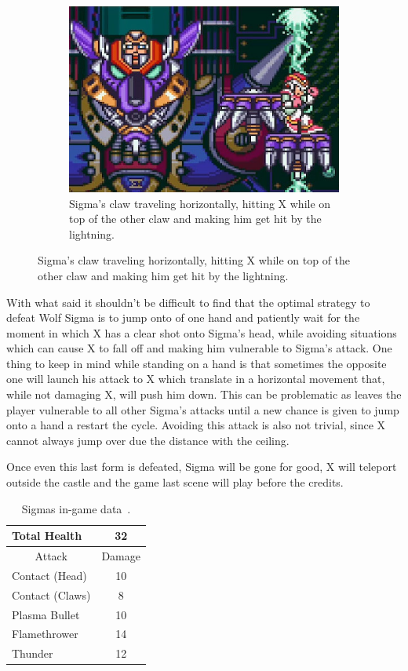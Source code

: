 \begin{figure}[htp]
	\centering
	\begin{subfigure}{0.5\linewidth}
		\centering
		\includegraphics[width=\linewidth]{figures/X1/Sigma_stages/WolfSigma_claw_2.jpg}
		\caption{Sigma's claw traveling horizontally, hitting X while on top of the other claw and making him get hit by the lightning.}
	\end{subfigure}
\end{figure}

With what said it shouldn't be difficult to find that the optimal strategy to defeat Wolf Sigma is to jump onto of one hand and patiently wait for the moment in which X has a clear shot onto Sigma's head, while avoiding situations which can cause X to fall off and making him vulnerable to Sigma's attack. One thing to keep in mind while standing on a hand is that sometimes the opposite one will launch his attack to X which translate in a horizontal movement that, while not damaging X, will push him down. This can be problematic as leaves the player vulnerable to all other Sigma's attacks until a new chance is given to jump onto a hand a restart the cycle. Avoiding this attack is also not trivial, since X cannot always jump over due the distance with the ceiling.

Once even this last form is defeated, Sigma will be gone for good, X will teleport outside the castle and the game last scene will play before the credits.
\begin{table}
	\centering
	\begin{tabular}[h]{l c}
		\toprule
		Total Health  & 32\\
		\midrule
		\multicolumn{1}{c}{Attack} & \multicolumn{1}{c}{Damage}\\
		Contact (Head) & 10\\
		Contact (Claws) & 8\\
		Plasma Bullet & 10\\
		Flamethrower & 14\\
		Thunder & 12\\
		\bottomrule
	\end{tabular}
	\caption{Sigmas in-game data~\cite{wiki:Sigma}.}
\end{table}

